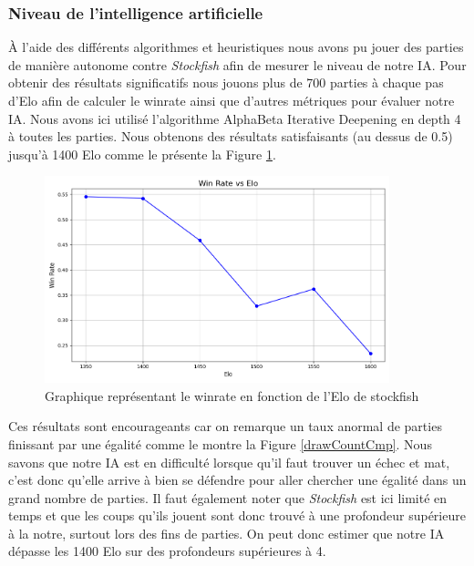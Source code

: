 \documentclass{article}
\begin{document}
\subsubsection{Niveau de l'intelligence artificielle}
À l'aide des différents algorithmes et heuristiques nous avons pu jouer des parties de manière autonome contre \textit{Stockfish} afin de mesurer le niveau de notre IA.
Pour obtenir des résultats significatifs nous jouons plus de 700 parties à chaque pas d'Elo afin de calculer le winrate ainsi que d'autres métriques pour évaluer notre IA.
Nous avons ici utilisé l'algorithme AlphaBeta Iterative Deepening en depth 4 à toutes les parties. Nous obtenons des résultats satisfaisants (au dessus de 0.5) jusqu’à 1400 Elo comme le présente la Figure \ref{winRateCmp}.

\begin{figure}[h]
    \centering
    \includegraphics[width=\textwidth,height=6.0cm,keepaspectratio]{winRateCmp.png}
    \caption{Graphique représentant le winrate en fonction de l'Elo de stockfish}
    \label{winRateCmp}
\end{figure}
\FloatBarrier

Ces résultats sont encourageants car on remarque un taux anormal de parties finissant par une égalité comme le montre la Figure \ref{drawCountCmp}. Nous savons que notre IA
est en difficulté lorsque qu'il faut trouver un échec et mat, c'est donc qu'elle arrive à bien se défendre pour aller chercher une égalité
dans un grand nombre de parties. Il faut également noter que \textit{Stockfish} est ici limité en temps et que les coups qu'ils jouent sont donc trouvé à une profondeur supérieure à la notre,
surtout lors des fins de parties. On peut donc estimer que notre IA dépasse les 1400 Elo sur des profondeurs supérieures à 4.
\end{document}
